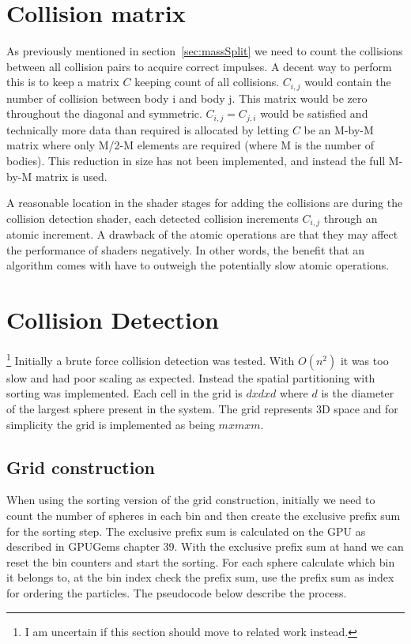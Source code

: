 \section{Collision matrix}\label{sec:colMatrix}
As previously mentioned in section~\ref{sec:massSplit} we need to count the collisions
between all collision pairs to acquire correct impulses. A decent way to perform
this is to keep a matrix $C$ keeping count of all collisions. $C_{i,j}$ would
contain the number of collision between body i and body j. This matrix would be
zero throughout the diagonal and symmetric. $C_{i,j} = C_{j,i}$ would
be satisfied and technically more data than required is allocated by letting $C$
be an M-by-M matrix where only M/2-M elements are required (where M is the
number of bodies). This reduction in size
has not been implemented, and instead the full M-by-M matrix is used.

A reasonable location in the shader stages for adding the collisions are during
the collision detection shader, each detected collision increments $C_{i,j}$
 through an atomic increment. A drawback of the atomic
 operations are that they may affect the performance of shaders negatively. In
 other words, the benefit that an algorithm comes with have to outweigh the potentially
 slow atomic operations.

\section{Collision Detection}\footnote{\textcolor{blue!80}{I am uncertain if this section should move to related work instead.}}\label{sec:implcd}
Initially a brute force collision detection was tested. With $O(n^2)$ it was too
slow and had poor scaling as expected. Instead the spatial partitioning with sorting
was implemented.
Each cell in the grid is $d x d x d$ where $d$ is the diameter of the largest sphere
present in the system. The grid represents 3D space and for simplicity the grid is
implemented as being $mxmxm$.

\subsection{Grid construction}
When using the sorting version of the grid construction, initially we need to count
the number of spheres in each bin and then create the exclusive prefix sum for the sorting
step. The exclusive prefix sum is calculated on the GPU as described in GPUGems chapter 39.
With the exclusive prefix sum at hand we can reset the bin counters and start the sorting.
For each sphere calculate which bin it belongs to, at the bin index check the prefix sum,
use the prefix sum as index for ordering the particles. The pseudocode below describe
the process.


